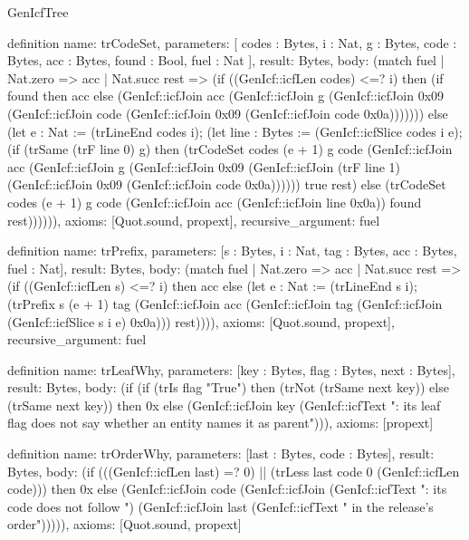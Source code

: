 \begin{lexlean}{GenIcfTree}
\begin{semanticmodule}
definition{
  name: trCodeSet,
  parameters: [
    codes : Bytes,
    i : Nat,
    g : Bytes,
    code : Bytes,
    acc : Bytes,
    found : Bool,
    fuel : Nat
  ],
  result: Bytes,
  body: (match fuel
    | Nat.zero => acc
    | Nat.succ rest => (if ((GenIcf::icfLen codes) <=? i) then (if found then acc else (GenIcf::icfJoin acc (GenIcf::icfJoin g (GenIcf::icfJoin 0x09 (GenIcf::icfJoin code (GenIcf::icfJoin 0x09 (GenIcf::icfJoin code 0x0a))))))) else (let e : Nat := (trLineEnd codes i); (let line : Bytes := (GenIcf::icfSlice codes i e); (if (trSame (trF line 0) g) then (trCodeSet codes (e + 1) g code (GenIcf::icfJoin acc (GenIcf::icfJoin g (GenIcf::icfJoin 0x09 (GenIcf::icfJoin (trF line 1) (GenIcf::icfJoin 0x09 (GenIcf::icfJoin code 0x0a)))))) true rest) else (trCodeSet codes (e + 1) g code (GenIcf::icfJoin acc (GenIcf::icfJoin line 0x0a)) found rest)))))),
  axioms: [Quot.sound, propext],
  recursive_argument: fuel
}

definition{
  name: trPrefix,
  parameters: [s : Bytes, i : Nat, tag : Bytes, acc : Bytes, fuel : Nat],
  result: Bytes,
  body: (match fuel
    | Nat.zero => acc
    | Nat.succ rest => (if ((GenIcf::icfLen s) <=? i) then acc else (let e : Nat := (trLineEnd s i); (trPrefix s (e + 1) tag (GenIcf::icfJoin acc (GenIcf::icfJoin tag (GenIcf::icfJoin (GenIcf::icfSlice s i e) 0x0a))) rest)))),
  axioms: [Quot.sound, propext],
  recursive_argument: fuel
}

definition{
  name: trLeafWhy,
  parameters: [key : Bytes, flag : Bytes, next : Bytes],
  result: Bytes,
  body: (if (if (trIs flag "True") then (trNot (trSame next key)) else (trSame next key)) then 0x else (GenIcf::icfJoin key (GenIcf::icfText ": its leaf flag does not say whether an entity names it as parent\n"))),
  axioms: [propext]
}

definition{
  name: trOrderWhy,
  parameters: [last : Bytes, code : Bytes],
  result: Bytes,
  body: (if (((GenIcf::icfLen last) =? 0) || (trLess last code 0 (GenIcf::icfLen code))) then 0x else (GenIcf::icfJoin code (GenIcf::icfJoin (GenIcf::icfText ": its code does not follow ") (GenIcf::icfJoin last (GenIcf::icfText " in the release's order\n"))))),
  axioms: [Quot.sound, propext]
}


\end{semanticmodule}
\end{lexlean}
